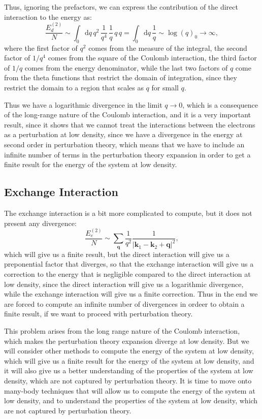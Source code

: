 Thus, ignoring the prefactors, we can express the contribution of the direct interaction to the energy as:
\[
    \frac{E^{(2)}_d}{N} \sim \int_0 \mathrm{d} q \, q^2 \,\frac{1}{q^4}\, \frac{1}{q}\, q\, q = \int_0 \mathrm{d} q \, \frac{1}{q } \sim \log(q)_0 \to \infty,
\]
where the first factor of \(q^2\) comes from the measure of the integral, the second factor of \(1/q^4\) comes from the square of the Coulomb interaction, the third factor of \(1/q\) comes from the energy denominator, while the last two factors of \(q\) come from the theta functions that restrict the domain of integration, since they restrict the domain to a region that scales as \(q\) for small \(q\).

Thus we have a logarithmic divergence in the limit \(q \to 0\), which is a consequence of the long-range nature of the Coulomb interaction, and it is a very important result, since it shows that we cannot treat the interactions between the electrons as a perturbation at low density, since we have a divergence in the energy at second order in perturbation theory, which means that we have to include an infinite number of terms in the perturbation theory expansion in order to get a finite result for the energy of the system at low density.

\subsection{Exchange Interaction}

The exchange interaction is a bit more complicated to compute, but it does not present any divergence:
\[
    \frac{E^{(2)}_e}{N} \sim \sum_{\mathbf{q}} \frac{1}{q^2} \frac{1}{\vert \mathbf{k}_1 - \mathbf{k}_2 + \mathbf{q} \vert^2 },
\]
which will give us a finite result, but the direct interaction will give us a preponential factor that diverges, so that the exchange interaction will give us a correction to the energy that is negligible compared to the direct interaction at low density, since the direct interaction will give us a logarithmic divergence, while the exchange interaction will give us a finite correction. Thus in the end we are forced to compute an infinite number of divergences in ordeer to obtain a finite result, if we want to proceed with perturbation theory.

This problem arises from the long range nature of the Coulomb interaction, which makes the perturbation theory expansion diverge at low density. But we will consider other methods to compute the energy of the system at low density, which will give us a finite result for the energy of the system at low density, and it will also give us a better understanding of the properties of the system at low density, which are not captured by perturbation theory. It is time to move onto many-body techniques that will allow us to compute the energy of the system at low density, and to understand the properties of the system at low density, which are not captured by perturbation theory.

